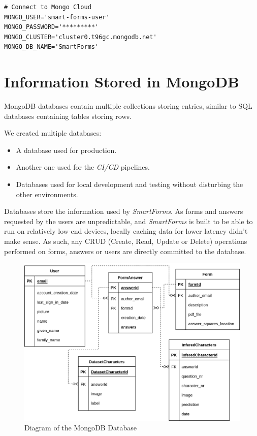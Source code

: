 \documentclass[11pt, a4paper]{report}
\begin{document}
\begin{verbatim}
# Connect to Mongo Cloud
MONGO_USER='smart-forms-user'
MONGO_PASSWORD='*********'
MONGO_CLUSTER='cluster0.t96gc.mongodb.net'
MONGO_DB_NAME='SmartForms'
\end{verbatim}

\section{Information Stored in MongoDB}

MongoDB databases contain multiple collections storing entries, similar to SQL databases containing tables storing rows.

We created multiple databases:
\begin{itemize}
    \item A database used for production.
    \item Another one used for the \textit{CI/CD} pipelines.
    \item Databases used for local development and testing without disturbing the other environments. 
\end{itemize}

Databases store the information used by \textit{SmartForms}. As forms and answers requested by the users are unpredictable, and \textit{SmartForms} is built to be able to run on relatively low-end devices, locally caching data for lower latency didn't make sense. As such, any CRUD (Create, Read, Update or Delete) operations performed on forms, answers or users are directly committed to the database.


\begin{figure}[!h]
    \centering
    \includegraphics[width=35em]{images/diagrams/ER_diagram.png}
    \caption{Diagram of the MongoDB Database}
    \label{fig:label}
\end{figure}
\end{document}
